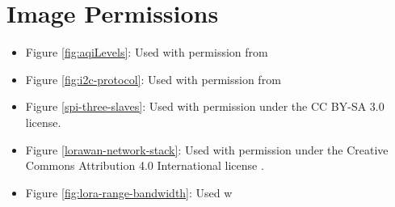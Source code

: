 \section{Image Permissions}


\begin{itemize}
\item Figure \ref{fig:aqiLevels}: Used with permission from

\item Figure \ref{fig:i2c-protocol}: Used with permission from \cite{i2c-protocol}

\item Figure \ref{spi-three-slaves}: Used with permission under the CC BY-SA 3.0 license. \cite{spi-image}

\item Figure \ref{lorawan-network-stack}: Used with permission under the Creative Commons Attribution 4.0 International license \cite{lorawan-network-stack}.

\item Figure \ref{fig:lora-range-bandwidth}: Used w
\end{itemize}